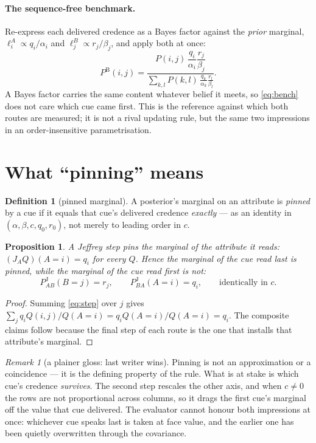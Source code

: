 \documentclass[11pt,a4paper]{article}
\newcommand{\PB}{P^{\mathrm{B}}}
\newcommand{\PJ}{P^{\mathrm{J}}}
\theoremstyle{definition}
\newtheorem{definition}{Definition}
\theoremstyle{plain}
\newtheorem{proposition}{Proposition}
\theoremstyle{remark}
\newtheorem{remark}{Remark}
\begin{document}
\paragraph{The sequence-free benchmark.}
Re-express each delivered credence as a Bayes factor against the \emph{prior}
marginal, $\ell^{A}_{i}\propto q_{i}/\alpha_{i}$ and
$\ell^{B}_{j}\propto r_{j}/\beta_{j}$, and apply both at once:
\begin{equation}
  \PB(i,j)
  =\frac{P(i,j)\,\dfrac{q_{i}}{\alpha_{i}}\dfrac{r_{j}}{\beta_{j}}}
        {\displaystyle\sum_{k,l}P(k,l)\,\frac{q_{k}}{\alpha_{k}}\frac{r_{l}}{\beta_{l}}} .
  \label{eq:bench}
\end{equation}
A Bayes factor carries the same content whatever belief it meets, so
\eqref{eq:bench} does not care which cue came first. This is the reference
against which both routes are measured; it is not a rival updating rule, but
the same two impressions in an order-insensitive parametrisation.

\section{What ``pinning'' means}

\begin{definition}[pinned marginal]\label{def:pin}
A posterior's marginal on an attribute is \emph{pinned} by a cue if it equals
that cue's delivered credence \emph{exactly} --- as an identity in
$(\alpha,\beta,c,q_{0},r_{0})$, not merely to leading order in $c$.
\end{definition}

\begin{proposition}\label{prop:pin}
A Jeffrey step pins the marginal of the attribute it reads:
$(J_{A}Q)(A{=}i)=q_{i}$ for every $Q$. Hence the marginal of the cue read
\emph{last} is pinned, while the marginal of the cue read \emph{first} is not:
\[
  \PJ_{AB}(B{=}j)=r_{j},
  \qquad
  \PJ_{BA}(A{=}i)=q_{i},
  \qquad\text{identically in } c .
\]
\end{proposition}

\begin{proof}
Summing \eqref{eq:step} over $j$ gives
$\sum_{j}q_{i}Q(i,j)/Q(A{=}i)=q_{i}Q(A{=}i)/Q(A{=}i)=q_{i}$. The composite
claims follow because the final step of each route is the one that installs
that attribute's marginal.
\end{proof}

\begin{remark}[a plainer gloss: last writer wins]
Pinning is not an approximation or a coincidence --- it is the defining
property of the rule. What is at stake is which cue's credence \emph{survives}.
The second step rescales the other axis, and when $c\neq0$ the rows are not
proportional across columns, so it drags the first cue's marginal off the value
that cue delivered. The evaluator cannot honour both impressions at once:
whichever cue speaks last is taken at face value, and the earlier one has been
quietly overwritten through the covariance.
\end{remark}
\end{document}
